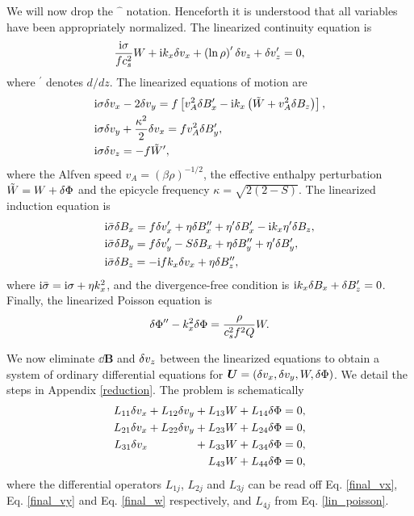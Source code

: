 We will now drop the $\hat{\phantom{a}}$ notation. Henceforth it is
understood that all variables have been appropriately normalized. The
linearized continuity equation is 
\begin{align}
  \frac{\mathrm{i}\sigma}{fc_s^2}W + \mathrm{i} k_x \delta v_x
  +\left(\ln\rho\right)^\prime\delta v_z + \delta v_z^\prime = 0,\label{lin_cont}
\end{align}
where $^\prime$ denotes $d/dz$. The linearized equations of motion are
\begin{align}
  &\mathrm{i}\sigma \delta v_x - 2\delta v_y = f\left[v_A^2\delta B_x^\prime - \mathrm{i} k_x
    \left(\tilde{W} + v_A^2\delta B_z
    \right)\right],\\
  &\mathrm{i}\sigma\delta v_y + \frac{\kappa^2}{2}\delta v_x = fv_A^2\delta B_y^\prime,\\
  & \mathrm{i}\sigma\delta v_z = -f\tilde{W}^\prime,
\end{align}
where the Alfven speed $v_A =
\left(\beta\rho\right)^{-1/2}$, the effective enthalpy perturbation
$\tilde{W} = W + \delta \Phi$ and the epicycle frequency $\kappa=\sqrt{2(2-S)}$. 
The linearized induction equation is
\begin{align}
&  \mathrm{i}\bar{\sigma}\delta B_x = f\delta v_x^\prime +
  \eta\delta B_x^{\prime\prime}+\eta^\prime\delta B_x^\prime - \mathrm{i} k_x
  \eta^\prime \delta B_z,\label{induct_x}\\
&\mathrm{i}\bar{\sigma}\delta B_y = f\delta v_y^\prime - S\delta B_x +
  \eta\delta B_y^{\prime\prime}+\eta^\prime\delta B_y^\prime,\label{induct_y}\\
& \mathrm{i}\bar{\sigma}\delta B_z = -\mathrm{i} f k_x \delta v_x + \eta\delta B_z^{\prime\prime}, \label{induct_vert}
\end{align}
where $\mathrm{i}\bar{\sigma} = \mathrm{i}\sigma + \eta k_x^2$, and the
divergence-free condition is $\mathrm{i} k_x\delta B_x + \delta B_z^\prime=0$. Finally,
the linearized Poisson equation is
\begin{align}
  \delta \Phi^{\prime\prime} - k_x^2\delta \Phi = \frac{\rho}{c_s^2f^2Q}W.  \label{lin_poisson}
\end{align}

We now eliminate $\dd\bm{B}$ and $\delta v_z$ between the linearized
equations to obtain a system of ordinary differential equations for
$\bm{U}=\left(\delta v_x,\delta v_y,W,\delta \Phi\right)$. We detail the steps 
in Appendix \ref{reduction}. The problem is schematically 
\begin{align}
  L_{11}\dvx + L_{12}\dvy + L_{13}W + L_{14}\dphi &= 0, \label{lin1}\\
  L_{21}\dvx + L_{22}\dvy + L_{23}W + L_{24}\dphi &= 0, \label{lin2}\\
  L_{31}\dvx \quad\quad\quad\,\,\,\,\,\,\, + L_{33}W + L_{34}\dphi &=0,\label{lin3}\\
  \phantom{L_{31}\dvx + L_{22}\dvy +} L_{43}W + L_{44}\dphi
  &=0\label{lin4}, 
\end{align}
where the differential operators $L_{1j}$, $L_{2j}$ and $L_{3j}$ can
be read off Eq. \ref{final_vx}, Eq. \ref{final_vy} and 
Eq. \ref{final_w} respectively, and $L_{4j}$ from
Eq. \ref{lin_poisson}. 

